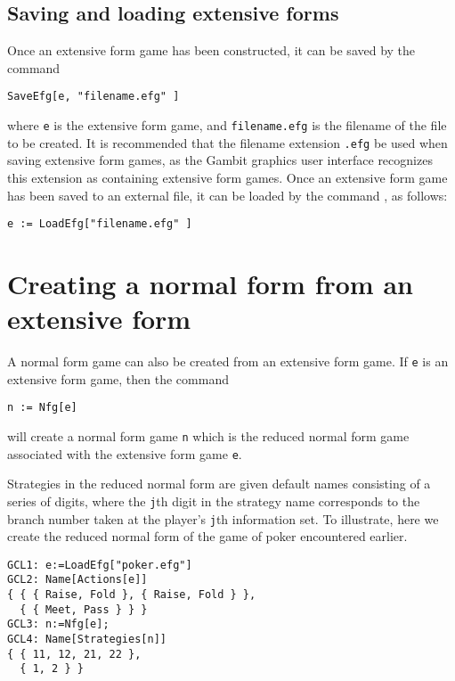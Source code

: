 \subsection{Saving and loading extensive forms}

Once an extensive form game has been constructed, it can be saved by
the command 

\begin{verbatim}
SaveEfg[e, "filename.efg" ]
\end{verbatim}

\noindent where \verb+e+ is the extensive form game, and
\verb+filename.efg+ is the filename of the file to be created.  It is
recommended that the filename extension \verb+.efg+ be used when
saving extensive form games, as the Gambit graphics user interface
recognizes this extension as containing extensive form games.  Once an
extensive form game has been saved to an external file, it can be
loaded by the command , as follows:

\begin{verbatim}
e := LoadEfg["filename.efg" ]
\end{verbatim}

\section{Creating a normal form from an extensive form}

A normal form game can also be created from an extensive form game.
If \verb+e+ is an extensive form game, then the command 

\begin{verbatim}
n := Nfg[e]
\end{verbatim}

\noindent
will create a normal form game \verb+n+ which is the reduced normal
form game associated with the extensive form game \verb+e+.  

Strategies in the reduced normal form are given default names
consisting of a series of digits, where the \verb+j+th digit in the
strategy name corresponds to the branch number taken at the player's
\verb+j+th information set.  To illustrate, here we create the reduced
normal form of the game of poker encountered earlier.  

\begin{verbatim}
GCL1: e:=LoadEfg["poker.efg"]
GCL2: Name[Actions[e]]
{ { { Raise, Fold }, { Raise, Fold } },
  { { Meet, Pass } } }
GCL3: n:=Nfg[e];
GCL4: Name[Strategies[n]]
{ { 11, 12, 21, 22 },
  { 1, 2 } }
\end{verbatim}

